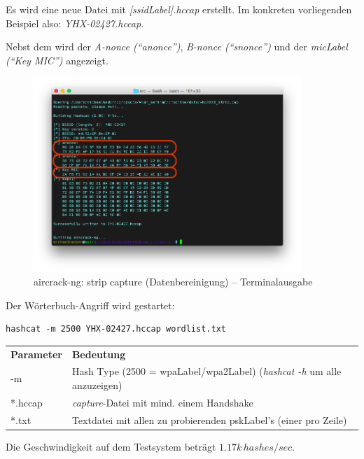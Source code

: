 Es wird eine neue Datei mit \textit{[\gls{ssidLabel}].hccap} erstellt. Im konkreten vorliegenden Beispiel also: \textit{YHX-02427.hccap}.

Nebst dem wird der \textit{A-nonce ("`anonce"')}, \textit{B-nonce ("`snonce"')} und der \textit{\gls{micLabel} ("`Key MIC"')} angezeigt.
\begin{figure}[H]
	\centering
	\includegraphics[width=0.9\textwidth]{images/wpa/conversion_cap2hccap.png}
	\caption{aircrack-ng: strip capture (Datenbereinigung) -- Terminalausgabe}
\end{figure}

Der Wörterbuch-Angriff wird gestartet:
\begin{lstlisting}[style=lstStyleFramed]
hashcat -m 2500 YHX-02427.hccap wordlist.txt
\end{lstlisting}
\begin{tabular}{l l}
	\textbf{Parameter} & \textbf{Bedeutung}\\
	-m & Hash Type (2500 = \gls{wpaLabel}/\gls{wpa2Label}) (\textit{hashcat -h} um alle anzuzeigen)\\
	*.hccap & \textit{capture}-Datei mit mind. einem Handshake\\
	*.txt & Textdatei mit allen zu probierenden \gls{pskLabel}'s (einer pro Zeile)\\
\end{tabular}

Die Geschwindigkeit auf dem Testsystem beträgt $1.17k\,hashes/sec$.

